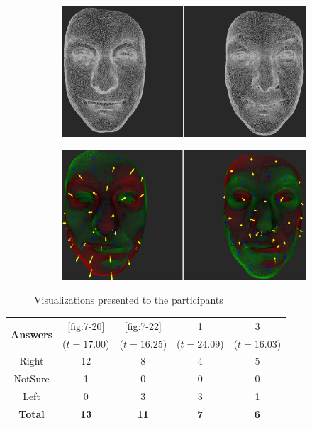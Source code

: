 \begin{figure}[h]
\begin{subfigure}{0.4\textwidth}
\includegraphics[width=\textwidth]{./screenshots/pair19.PNG}
\caption{}
\label{fig:7-19}
\end{subfigure}
\quad
\begin{subfigure}{0.4\textwidth}
\includegraphics[width=\textwidth]{./screenshots/pair21.PNG}
\caption{}
\label{fig:7-21}
\end{subfigure}
\caption{Visualizations presented to the participants}
\end{figure}
\medskip
\begin{center}
\begin{tabular}{| c | c | c | c | c |}
	\hline
\multirow{2}{*}{\bf Answers} & \ref{fig:7-20} & \ref{fig:7-22} & \ref{fig:7-19} & \ref{fig:7-21}\\
	&  (\(t=17.00\)) &  (\(t=16.25\)) &  (\(t=24.09\)) &  (\(t=16.03\))\\ \hline
	Right & 12 & 8 & 4 & 5\\ \hline
	NotSure & 1 & 0 & 0 & 0\\ \hline
	Left & 0 & 3 & 3 & 1\\ \hline
	{\bf Total} & {\bf 13} & {\bf 11} & {\bf 7} & {\bf 6}\\ \hline
\end{tabular}
\end{center}
\clearpage

